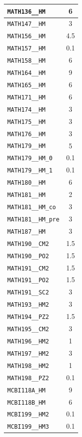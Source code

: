 \begin{longtable}{|p{}|c|}
    \verb|MATH136__HM| & 6\\\hline
    \verb|MATH147__HM| & 3\\\hline
    \verb|MATH156__HM| & 4.5\\\hline
    \verb|MATH157__HM| & 0.1\\\hline
    \verb|MATH158__HM| & 6\\\hline
    \verb|MATH164__HM| & 9\\\hline
    \verb|MATH165__HM| & 6\\\hline
    \verb|MATH171__HM| & 6\\\hline
    \verb|MATH174__HM| & 3\\\hline
    \verb|MATH175__HM| & 3\\\hline
    \verb|MATH176__HM| & 3\\\hline
    \verb|MATH179__HM| & 5\\\hline
    \verb|MATH179__HM_0| & 0.1\\\hline
    \verb|MATH179__HM_1| & 0.1\\\hline
    \verb|MATH180__HM| & 6\\\hline
    \verb|MATH181__HM| & 2\\\hline
    \verb|MATH181__HM_co| & 3\\\hline
    \verb|MATH181__HM_pre| & 3\\\hline
    \verb|MATH187__HM| & 3\\\hline
    \verb|MATH190__CM2| & 1.5\\\hline
    \verb|MATH190__PO2| & 1.5\\\hline
    \verb|MATH191__CM2| & 1.5\\\hline
    \verb|MATH191__PO2| & 1.5\\\hline
    \verb|MATH191__SC2| & 3\\\hline
    \verb|MATH193__HM2| & 3\\\hline
    \verb|MATH194__PZ2| & 1.5\\\hline
    \verb|MATH195__CM2| & 3\\\hline
    \verb|MATH196__HM2| & 1\\\hline
    \verb|MATH197__HM2| & 3\\\hline
    \verb|MATH198__HM2| & 1\\\hline
    \verb|MATH198__PZ2| & 0.1\\\hline
    \verb|MCBI118A_HM| & 9\\\hline
    \verb|MCBI118B_HM| & 6\\\hline
    \verb|MCBI199__HM2| & 0.1\\\hline
    \verb|MCBI199__HM3| & 0.1\\\hline

\end{longtable}
